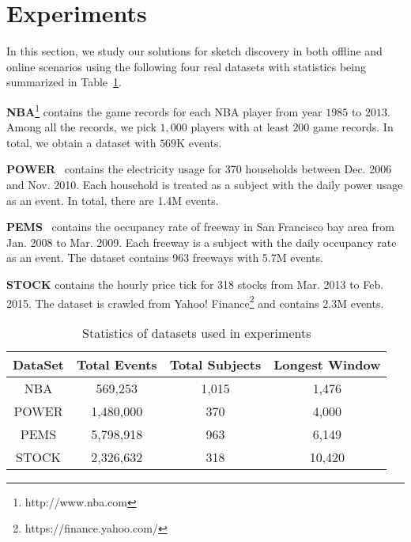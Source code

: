 \section{Experiments}\label{sec:experiment}
In this section, we study our solutions for sketch discovery in both offline and online scenarios using the following four real datasets with statistics being summarized in Table~\ref{tbl:dataset}.

\noindent\textbf{NBA}\footnote{http://www.nba.com} contains the game records for each NBA player from year $1985$ to $2013$. Among all the records, we pick $1,000$ players with at least $200$ game records. In total, we obtain a dataset with $569$K events.

\noindent\textbf{POWER}~\cite{Lichman2013} contains the electricity usage for 370 households between Dec. 2006 and Nov. 2010. Each household is treated as a subject with the daily power usage as an event. In total, there are 1.4M events.

\noindent\textbf{PEMS}~\cite{choe2002freeway} contains the occupancy rate of freeway in San Francisco bay area from Jan. 2008 to Mar. 2009. Each freeway is a subject with the daily occupancy rate as an event. The dataset contains 963 freeways with 5.7M events.

\noindent\textbf{STOCK} contains the hourly price tick for 318 stocks from Mar. 2013 to Feb. 2015.
The dataset is crawled from Yahoo! Finance\footnote{https://finance.yahoo.com/} and contains 2.3M events.

 
{\renewcommand{\arraystretch}{1.2} 
\begin{table}[h]
\caption{Statistics of datasets used in experiments}
\centering
\begin{tabular}{|c|c|c|c|}
\hline
DataSet & Total Events & Total Subjects  & Longest Window \\
\hline
NBA & 569,253 & 1,015&  1,476 \\
\hline
POWER & 1,480,000 & 370 & 4,000 \\
\hline
PEMS & 5,798,918 & 963&  6,149 \\
\hline
STOCK & 2,326,632 & 318&  10,420 \\
\hline
\end{tabular}
\label{tbl:dataset}
\end{table}
}


